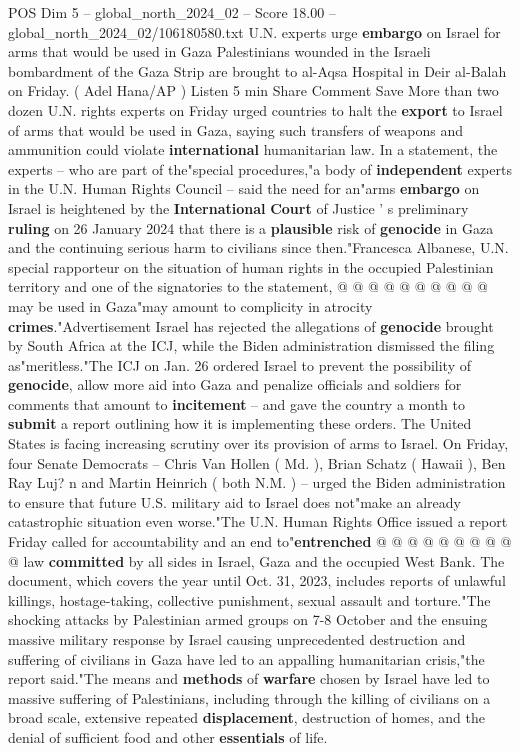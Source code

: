 \begin{textsample}{POS Dim 5 – global\_north\_2024\_02 – Score 18.00 – global\_north\_2024\_02/106180580.txt}  \label{ex:f5_pos_237}
U.N. experts urge \textbf{embargo} on Israel for arms that would be used in Gaza Palestinians wounded in the Israeli bombardment of the Gaza Strip are brought to al-Aqsa Hospital in Deir al-Balah on Friday. ( Adel Hana/AP ) Listen 5 min Share Comment Save More than two dozen U.N. rights experts on Friday urged countries to halt the \textbf{export} to Israel of arms that would be used in Gaza, saying such transfers of weapons and ammunition could violate \textbf{international} humanitarian law.
In a statement, the experts -- who are part of the"special procedures,"a body of \textbf{independent} experts in the U.N.
Human Rights Council -- said the need for an"arms \textbf{embargo} on Israel is heightened by the \textbf{International} \textbf{Court} of Justice ' s preliminary \textbf{ruling} on 26 January 2024 that there is a \textbf{plausible} risk of \textbf{genocide} in Gaza and the continuing serious harm to civilians since then."Francesca Albanese, U.N. special rapporteur on the situation of human rights in the occupied Palestinian territory and one of the signatories to the statement, @ @ @ @ @ @ @ @ @ @ may be used in Gaza"may amount to complicity in atrocity \textbf{crimes}."Advertisement Israel has rejected the allegations of \textbf{genocide} brought by South Africa at the ICJ, while the Biden administration dismissed the filing as"meritless."The ICJ on Jan. 26 ordered Israel to prevent the possibility of \textbf{genocide}, allow more aid into Gaza and penalize officials and soldiers for comments that amount to \textbf{incitement} -- and gave the country a month to \textbf{submit} a report outlining how it is implementing these orders.
The United States is facing increasing scrutiny over its provision of arms to Israel.
On Friday, four Senate Democrats -- Chris Van Hollen ( Md. ), Brian Schatz ( Hawaii ), Ben Ray Luj? n and Martin Heinrich ( both N.M. ) -- urged the Biden administration to ensure that future U.S. military aid to Israel does not"make an already catastrophic situation even worse."The U.N.
Human Rights Office issued a report Friday called for accountability and an end to"\textbf{entrenched} @ @ @ @ @ @ @ @ @ @ law \textbf{committed} by all sides in Israel, Gaza and the occupied West Bank.
The document, which covers the year until Oct. 31, 2023, includes reports of unlawful killings, hostage-taking, collective punishment, sexual assault and torture."The shocking attacks by Palestinian armed groups on 7-8 October and the ensuing massive military response by Israel causing unprecedented destruction and suffering of civilians in Gaza have led to an appalling humanitarian crisis,"the report said."The means and \textbf{methods} of \textbf{warfare} chosen by Israel have led to massive suffering of Palestinians, including through the killing of civilians on a broad scale, extensive repeated \textbf{displacement}, destruction of homes, and the denial of sufficient food and other \textbf{essentials} of life.

\end{textsample}
